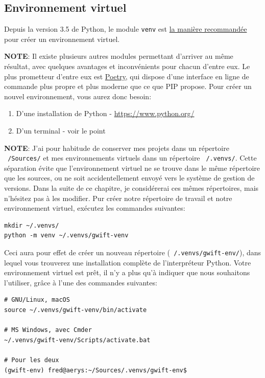 \documentclass[11pt]{amsbook}
\newcommand{\admonition}[2]{\textbf{#1}: {#2}}
\begin{document}
\hypertarget{x-environnement-virtuel}{\subsection{Environnement virtuel}}
Depuis la version 3.5 de Python, le module \texttt{venv} est \href{https://docs.python.org/3/library/venv.html}{la manière recommandée} pour créer un environnement virtuel.


\admonition{NOTE}{Il existe plusieurs autres modules permettant d’arriver au même résultat, avec quelques avantages et inconvénients pour chacun d’entre eux. Le plus prometteur d’entre eux est \href{https://python-poetry.org/}{Poetry}, qui dispose d’une interface en ligne de commande plus propre et plus moderne que ce que PIP propose.}
Pour créer un nouvel environnement, vous aurez donc besoin:


\begin{enumerate}

\item{D’une installation de Python - \href{https://www.python.org/}{https://www.python.org/}}

\item{D’un terminal - voir le point \hyperlink{../environment/-index#un-terminal}{}}

\end{enumerate}


\admonition{NOTE}{J’ai pour habitude de conserver mes projets dans un répertoire \texttt{~/Sources/} et mes environnements virtuels dans un répertoire \texttt{~/.venvs/}.
Cette séparation évite que l’environnement virtuel ne se trouve dans le même répertoire que les sources, ou ne soit accidentellement envoyé vers le système de gestion de versions.
Dans la suite de ce chapitre, je considérerai ces mêmes répertoires, mais n’hésitez pas à les modifier.}
Pur créer notre répertoire de travail et notre environnement virtuel, exécutez les commandes suivantes:


\begin{verbatim}
mkdir ~/.venvs/
python -m venv ~/.venvs/gwift-venv
\end{verbatim}

Ceci aura pour effet de créer un nouveau répertoire (\texttt{~/.venvs/gwift-env/}), dans lequel vous trouverez une installation complète de l’interpréteur Python.
Votre environnement virtuel est prêt, il n’y a plus qu’à indiquer que nous souhaitons l’utiliser, grâce à l’une des commandes suivantes:


\begin{verbatim}
# GNU/Linux, macOS
source ~/.venvs/gwift-venv/bin/activate

# MS Windows, avec Cmder
~/.venvs/gwift-venv/Scripts/activate.bat

# Pour les deux
(gwift-env) fred@aerys:~/Sources/.venvs/gwift-env$ 
\end{verbatim}
\end{document}
